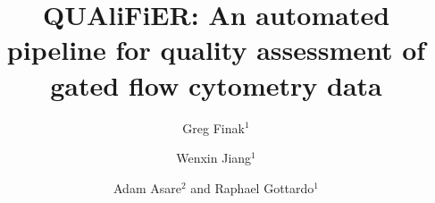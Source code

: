 \documentclass[10pt]{bmc_article}
\newenvironment{bmcformat}{\baselineskip20pt\sloppy\setboolean{publ}{false}}{\baselineskip20pt\sloppy}
\begin{document}
\begin{bmcformat}



\title{QUAliFiER: An automated pipeline for quality assessment of gated flow cytometry data}
 


\author{Greg Finak$^1$%
      \and
      Wenxin Jiang$^{1}$%
      \and
         Adam Asare$^2$%
       and 
         Raphael Gottardo\correspondingauthor$^1$%
      }
      


\address{%
    \iid(1)Fred Hutchinson Cancer Research Center, 1100 Fairview Avenue North, Seattle, WA 98109, USA\\
    \iid(2)Data Center and Data Analysis, the Immune Tolerance Network ,3
    Bethesda Metro Center,Bethesda, MD 20814,USA }%
\maketitle




\end{bmcformat}
\end{document}
